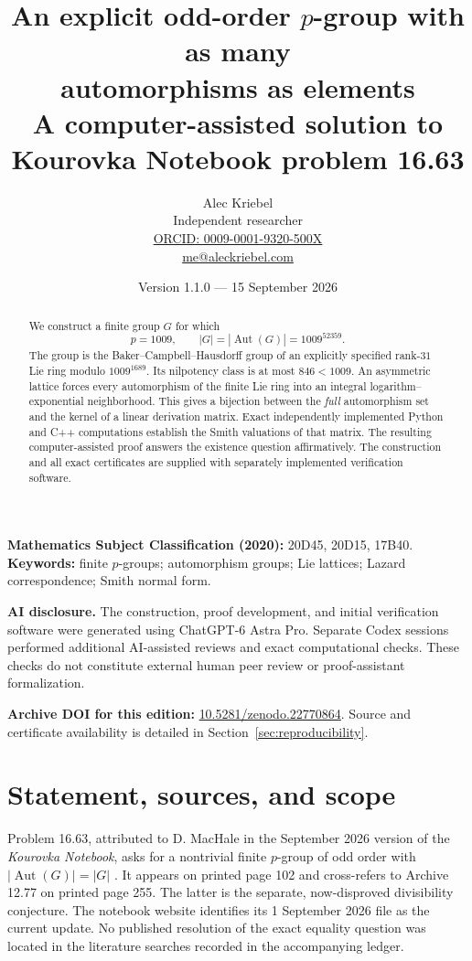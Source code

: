 \documentclass[11pt]{article}
\title{An explicit odd-order $p$-group with as many\\automorphisms as elements\\[5pt]
\large A computer-assisted solution to Kourovka Notebook problem 16.63}
\author{Alec Kriebel\\[3pt]
\small Independent researcher\\
\small\href{https://orcid.org/0009-0001-9320-500X}{ORCID: 0009-0001-9320-500X}\\
\small\href{mailto:me@aleckriebel.com}{me@aleckriebel.com}}
\date{Version 1.1.0 --- 15 September 2026}
\theoremstyle{definition}\newtheorem{definition}[theorem]{Definition}
\theoremstyle{remark}\newtheorem{remark}[theorem]{Remark}
\DeclareMathOperator{\Aut}{Aut}
\begin{document}
\maketitle
\begin{abstract}
We construct a finite group $G$ for which
\[
 p=1009,\qquad |G|=|\Aut(G)|=1009^{52359}.
\]
The group is the Baker--Campbell--Hausdorff group of an explicitly specified
rank-$31$ Lie ring modulo $1009^{1689}$. Its nilpotency class is at most $846<1009$.
An asymmetric lattice forces every automorphism of the finite Lie ring into an
integral logarithm--exponential neighborhood. This gives a bijection between the
\emph{full} automorphism set and the kernel of a linear derivation matrix.
Exact independently implemented Python and C++ computations establish the
Smith valuations of that matrix. The resulting computer-assisted proof answers the existence question
affirmatively. The construction and all exact certificates are supplied
with separately implemented verification software.
\end{abstract}
\medskip
\noindent\textbf{Mathematics Subject Classification (2020):} 20D45, 20D15, 17B40.\\
\textbf{Keywords:} finite $p$-groups; automorphism groups; Lie lattices;
Lazard correspondence; Smith normal form.

\medskip
\noindent\textbf{AI disclosure.} The construction, proof development, and initial
verification software were generated using ChatGPT-6 Astra Pro. Separate Codex
sessions performed additional AI-assisted reviews and exact computational checks.
These checks do not constitute external human peer review or proof-assistant
formalization.

\medskip
\noindent\textbf{Archive DOI for this edition:}
\href{https://doi.org/10.5281/zenodo.22770864}{10.5281/zenodo.22770864}.
Source and certificate availability is detailed in Section~\ref{sec:reproducibility}.

\clearpage
{\small\tableofcontents}
\clearpage

\section{Statement, sources, and scope}
Problem 16.63, attributed to D. MacHale in the September 2026 version of the
\emph{Kourovka Notebook}, asks for a nontrivial finite $p$-group of
odd order with $|\Aut(G)|=|G|$ \cite{KN}. It appears on printed page 102 and
cross-refers to Archive 12.77 on printed page 255. The latter is the separate,
now-disproved divisibility conjecture. The notebook website identifies its
1 September 2026 file as the current update. No published resolution of the
exact equality question was located in the literature searches recorded in the
accompanying ledger.
\end{document}

